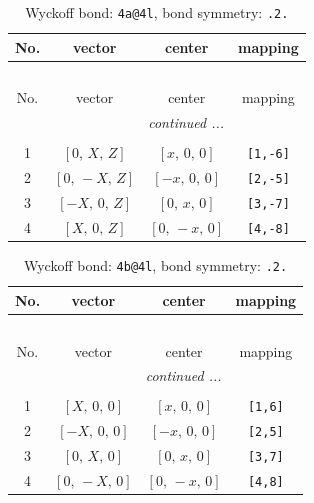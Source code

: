 \documentclass[fleqn,8pt]{jsarticle}
\begin{document}
\begin{longtable}{cccc}
\caption{Wyckoff bond: {\tt 4a@4l}, bond symmetry: {\tt .2.}}
 \\
 \hline \hline
No. & vector & center & mapping \\ \hline \endfirsthead

\multicolumn{3}{l}{\tablename\ \thetable{}} \\
 \hline \hline
No. & vector & center & mapping \\ \hline \endhead

 \hline \hline
\multicolumn{3}{r}{\footnotesize\it continued ...} \\ \endfoot

 \hline \hline
\multicolumn{3}{r}{} \\ \endlastfoot

1 & $\left[ 0,\, X,\, Z \right]$ & $\left[ x,\, 0,\, 0 \right]$ & {\tt [1,-6]} \\ \hline
2 & $\left[ 0,\, - X,\, Z \right]$ & $\left[ - x,\, 0,\, 0 \right]$ & {\tt [2,-5]} \\ \hline
3 & $\left[ - X,\, 0,\, Z \right]$ & $\left[ 0,\, x,\, 0 \right]$ & {\tt [3,-7]} \\ \hline
4 & $\left[ X,\, 0,\, Z \right]$ & $\left[ 0,\, - x,\, 0 \right]$ & {\tt [4,-8]} \\
\end{longtable}
\renewcommand{\arraystretch}{1.2}
\begin{longtable}{cccc}
\caption{Wyckoff bond: {\tt 4b@4l}, bond symmetry: {\tt .2.}}
 \\
 \hline \hline
No. & vector & center & mapping \\ \hline \endfirsthead

\multicolumn{3}{l}{\tablename\ \thetable{}} \\
 \hline \hline
No. & vector & center & mapping \\ \hline \endhead

 \hline \hline
\multicolumn{3}{r}{\footnotesize\it continued ...} \\ \endfoot

 \hline \hline
\multicolumn{3}{r}{} \\ \endlastfoot

1 & $\left[ X,\, 0,\, 0 \right]$ & $\left[ x,\, 0,\, 0 \right]$ & {\tt [1,6]} \\ \hline
2 & $\left[ - X,\, 0,\, 0 \right]$ & $\left[ - x,\, 0,\, 0 \right]$ & {\tt [2,5]} \\ \hline
3 & $\left[ 0,\, X,\, 0 \right]$ & $\left[ 0,\, x,\, 0 \right]$ & {\tt [3,7]} \\ \hline
4 & $\left[ 0,\, - X,\, 0 \right]$ & $\left[ 0,\, - x,\, 0 \right]$ & {\tt [4,8]} \\
\end{longtable}
\end{document}
